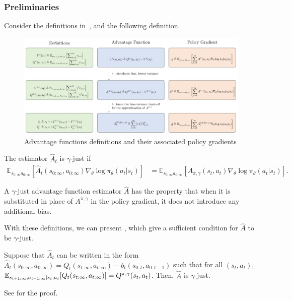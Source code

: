 \documentclass{article}
\begin{document}
\vspace{10pt}
\subsubsection{Preliminaries}
Consider the definitions in~, and the following definition.

\begin{figure}[h]
    \centering
    \includegraphics[width=1.0\linewidth]{Figures/GAE_table_latex.pdf}
    \caption{Advantage functions definitions and their associated policy gradients}
    \label{fig:gae_summary}
\end{figure}


\begin{definition} 
The estimator $\hat{A}_t$ is $\gamma$-just if
\begin{align*}
\mathbb{E}_{s_{0:\infty} a_{0:\infty}} [\hat{A}_t(s_{0:\infty}, a_{0:\infty}) \nabla_{\theta} \log \pi_{\theta}(a_t | s_t) ] &= \mathbb{E}_{s_{0:\infty} a_{0:\infty}} [A_{\pi,\gamma}(s_t, a_t) \nabla_{\theta} \log \pi_{\theta}(a_t | s_t)].
\end{align*}
\end{definition}

A $\gamma$-just advantage function estimator $\hat{A}$ has the property that when it is substituted in place of $A^{\pi,\gamma}$ in the policy gradient, it does not introduce any additional bias.

With these definitions, we can present , which give a sufficient condition for $\hat A$ to be $\gamma$-just.

\begin{proposition}\label{prop:GAE_prop}
    Suppose that $\hat A_t$ can be written in the form $\hat A_t(s_{0:\infty},a_{0:\infty}) = Q_t(s_{t:\infty},a_{t:\infty}) - b_t(s_{0:t},a_{0:t-1})$ such that for all $(s_t,a_t)$, ${\mathbb E}_{s_{t+1:\infty}, a_{t+1:\infty}\vert {s_t, a_t}}[Q_t(s_{t:\infty},a_{t:\infty})] = Q^{\pi, \gamma}(s_t, a_t)$. Then, $\hat A$ is $\gamma$-just.
\end{proposition}
See \cite{schulman2015high} for the proof.
\end{document}
